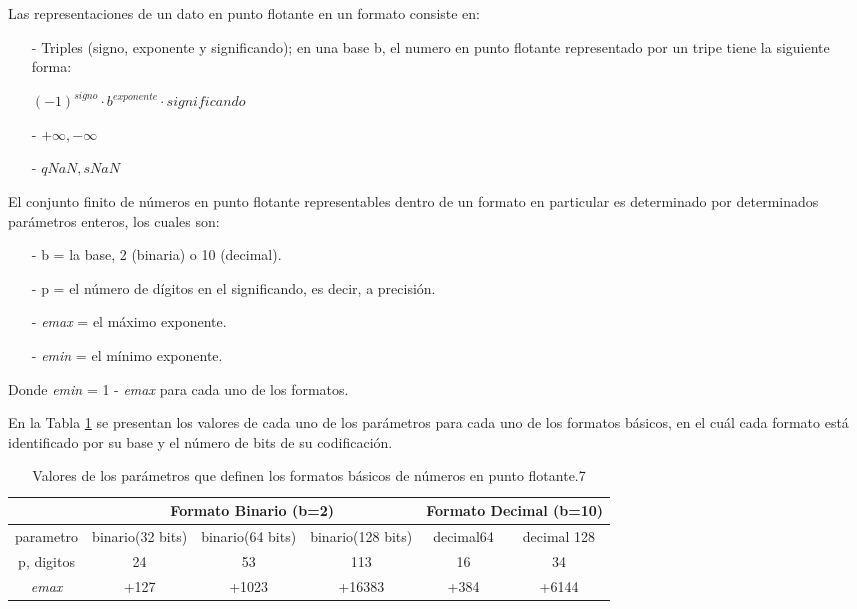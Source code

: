 Las representaciones de un dato en punto flotante en un formato consiste en:

\begin{itemize}
	\item[-]	Triples (signo, exponente y significando); en una base b, el numero en punto flotante representado por un tripe tiene la siguiente forma:
    \begin{center} $(-1)^{signo} \cdot b^{exponente} \cdot significando $ \end{center}
	\item[-]	$+\infty, -\infty $
	\item[-]	$qNaN, sNaN$
\end{itemize}

El conjunto finito de números en punto flotante representables dentro de un formato en particular es determinado por determinados parámetros enteros, los cuales son: 

\begin{itemize}
	\item[-]		b = la base, 2 (binaria) o 10 (decimal).
	\item[-]		p = el número de dígitos en el significando, es decir, a precisión.
	\item[-]		\textit{emax} = el máximo exponente.
	\item[-]		\textit{emin} = el mínimo exponente.
\end{itemize}

Donde \textit{emin} = 1 - \textit{emax} para cada uno de los formatos.

En la Tabla \ref{Tabla_Parametros}  se presentan los valores de cada uno de los parámetros para cada uno de los formatos básicos, en el cuál cada formato está identificado por su base y el número de bits de su codificación.

\begin{table}[H]
\centering
\caption{Valores de los parámetros que definen los formatos básicos de números en punto flotante.7}
\label{Tabla_Parametros}
\begin{tabular}{c|c|c|c|c|c|}
\cline{2-6}
                                    & \multicolumn{3}{c|}{Formato Binario (b=2)}              & \multicolumn{2}{c|}{Formato Decimal (b=10)} \\ \hline
\multicolumn{1}{|c|}{parametro}     & binario(32 bits) & binario(64 bits) & binario(128 bits) & decimal64           & decimal 128           \\ \hline
\multicolumn{1}{|c|}{p, digitos}    & 24               & 53               & 113               & 16                  & 34                    \\ \hline
\multicolumn{1}{|c|}{\textit{emax}} & +127             & +1023            & +16383            & +384                & +6144                 \\ \hline
\end{tabular}
\end{table}

